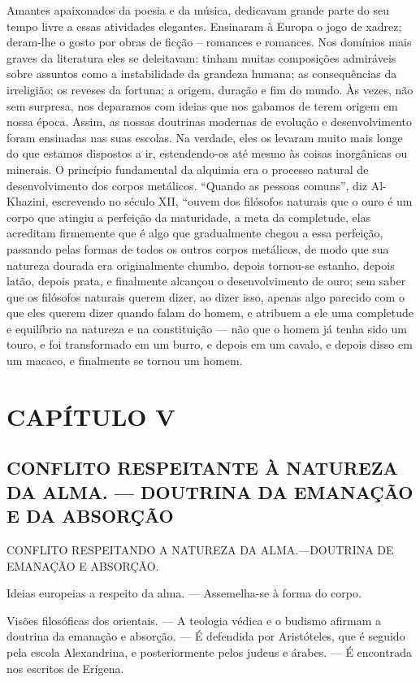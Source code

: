 \documentclass[11pt,a5paper,twoside,openany]{book}
\begin{document}
Amantes apaixonados da poesia e da música, dedicavam grande parte do seu tempo livre a essas atividades elegantes. Ensinaram à Europa o jogo de xadrez; deram-lhe o gosto por obras de ficção – romances e romances. Nos domínios mais graves da literatura eles se deleitavam: tinham muitas composições admiráveis ​​sobre assuntos como a instabilidade da grandeza humana; as consequências da irreligião; os reveses da fortuna; a origem, duração e fim do mundo. Às vezes, não sem surpresa, nos deparamos com ideias que nos gabamos de terem origem em nossa época. Assim, as nossas doutrinas modernas de evolução e desenvolvimento foram ensinadas nas suas escolas. Na verdade, eles os levaram muito mais longe do que estamos dispostos a ir, estendendo-os até mesmo às coisas inorgânicas ou minerais. O princípio fundamental da alquimia era o processo natural de desenvolvimento dos corpos metálicos. “Quando as pessoas comuns”, diz Al-Khazini, escrevendo no século XII, “ouvem dos filósofos naturais que o ouro é um corpo que atingiu a perfeição da maturidade, a meta da completude, elas acreditam firmemente que é algo que gradualmente chegou a essa perfeição, passando pelas formas de todos os outros corpos metálicos, de modo que sua natureza dourada era originalmente chumbo, depois tornou-se estanho, depois latão, depois prata, e finalmente alcançou o desenvolvimento de ouro; sem saber que os filósofos naturais querem dizer, ao dizer isso, apenas algo parecido com o que eles querem dizer quando falam do homem, e atribuem a ele uma completude e equilíbrio na natureza e na constituição — não que o homem já tenha sido um touro, e foi transformado em um burro, e depois em um cavalo, e depois disso em um macaco, e finalmente se tornou um homem.

\clearpage
\chapter*{CAPÍTULO V}
\section*{CONFLITO RESPEITANTE À NATUREZA DA ALMA. — DOUTRINA DA EMANAÇÃO E DA ABSORÇÃO}
CONFLITO RESPEITANDO A NATUREZA DA ALMA.—DOUTRINA DE EMANAÇÃO E ABSORÇÃO.

Ideias europeias a respeito da alma. — Assemelha-se à forma do corpo.

Visões filosóficas dos orientais. — A teologia védica e o budismo afirmam a doutrina da emanação e absorção. — É defendida por Aristóteles, que é seguido pela escola Alexandrina, e posteriormente pelos judeus e árabes. — É encontrada nos escritos de Erígena.
\end{document}

